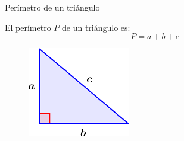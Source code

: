 \begin{infocard}{Perímetro de un triángulo}
    \begin{minipage}{0.35\textwidth}
        El perímetro $P$ de un triángulo es:
        \[P=a+b+c\]
    \end{minipage}\hfill
    \begin{minipage}{0.5\textwidth}
        \begin{figure}[H]
            \centering
            \includegraphics[width=0.5\linewidth]{../images/triangulo_perimetro.png}
            \caption{}
            \label{fig:20230402132954}
        \end{figure}
    \end{minipage}
\end{infocard}